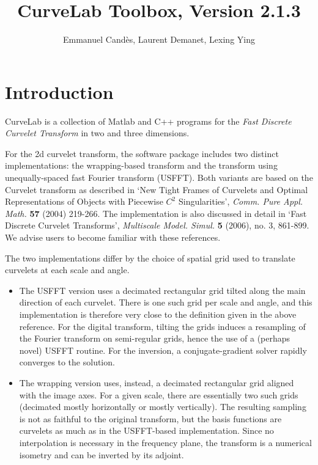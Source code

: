 \documentclass[11pt]{article}
\title{CurveLab Toolbox, Version 2.1.3}
\author{Emmanuel Cand\`{e}s, Laurent Demanet,  Lexing Ying
}
\date{}
\begin{document}
\maketitle
\section{Introduction}
CurveLab is a collection of Matlab and C++ programs for the {\em Fast
Discrete Curvelet Transform} in two and three dimensions.

For the 2d curvelet transform, the software package includes two
distinct implementations: the wrapping-based transform and the
transform using unequally-spaced fast Fourier transform (USFFT). Both
variants are based on the Curvelet transform as described in `New
Tight Frames of Curvelets and Optimal Representations of Objects with
Piecewise $C^2$ Singularities', {\it Comm. Pure Appl. Math.}  {\bf 57}
(2004) 219-266. The implementation is also discussed in detail in
`Fast Discrete Curvelet Transforms', {\it Multiscale Model. Simul.}
{\bf 5} (2006), no. 3, 861-899. We
advise users to become familiar with these references.

The two implementations differ by the choice of spatial grid used to
translate curvelets at each scale and angle.
\begin{itemize}
\item The USFFT version uses a decimated rectangular grid tilted along
  the main direction of each curvelet. There is one such grid per
  scale and angle, and this implementation is therefore very close to
  the definition given in the above reference. For the digital
  transform, tilting the grids induces a resampling of the Fourier
  transform on semi-regular grids, hence the use of a (perhaps novel)
  USFFT routine. For the inversion, a conjugate-gradient solver
  rapidly converges to the solution.
\item The wrapping version uses, instead, a decimated rectangular grid
  aligned with the image axes. For a given scale, there are
  essentially two such grids (decimated mostly horizontally or mostly
  vertically). The resulting sampling is not as faithful to the
  original transform, but the basis functions are curvelets as much as
  in the USFFT-based implementation. Since no interpolation is
  necessary in the frequency plane, the transform is a numerical
  isometry and can be inverted by its adjoint.
\end{itemize}
\end{document}
